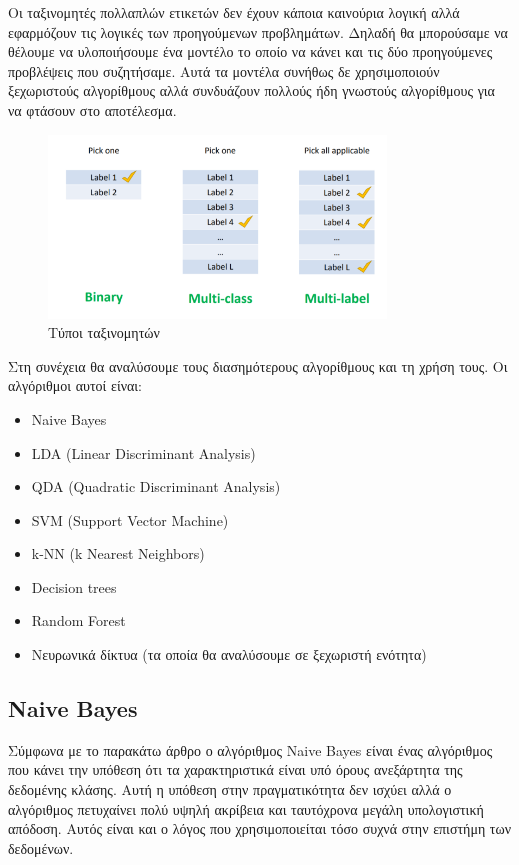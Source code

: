 Οι ταξινομητές πολλαπλών ετικετών δεν έχουν κάποια καινούρια
λογική αλλά εφαρμόζουν τις λογικές των προηγούμενων
προβλημάτων. Δηλαδή θα μπορούσαμε να θέλουμε να υλοποιήσουμε
ένα μοντέλο το οποίο να κάνει και τις δύο προηγούμενες
προβλέψεις που συζητήσαμε. Αυτά τα μοντέλα συνήθως δε
χρησιμοποιούν ξεχωριστούς αλγορίθμους αλλά συνδυάζουν
πολλούς ήδη γνωστούς αλγορίθμους για να φτάσουν στο
αποτέλεσμα.
\begin{figure}[H]
    \centering
    \includegraphics[width=0.8\textwidth]{images/typesOfClassifiers.png}
    \caption{Τύποι ταξινομητών}
\end{figure}

Στη συνέχεια θα αναλύσουμε τους διασημότερους αλγορίθμους
και τη χρήση τους. Οι αλγόριθμοι αυτοί είναι\cite{algo7, algo8, algo82}:
\begin{itemize}
    \item \textlatin{Naive Bayes}
    \item \textlatin{LDA (Linear Discriminant Analysis)}
    \item \textlatin{QDA (Quadratic Discriminant Analysis)}
    \item \textlatin{SVM (Support Vector Machine)}
    \item \textlatin{k-NN (k Nearest Neighbors)}
    \item \textlatin{Decision trees}
    \item \textlatin{Random Forest}
    \item Νευρωνικά δίκτυα (τα οποία θα αναλύσουμε σε ξεχωριστή ενότητα)
\end{itemize}

\subsection{\textlatin{Naive Bayes}}
Σύμφωνα με το παρακάτω άρθρο \cite{webb2010naive} ο αλγόριθμος \textlatin{Naive Bayes} είναι
ένας αλγόριθμος που κάνει την υπόθεση ότι τα χαρακτηριστικά είναι υπό όρους ανεξάρτητα της
δεδομένης κλάσης. Αυτή η υπόθεση στην πραγματικότητα δεν ισχύει αλλά ο αλγόριθμος πετυχαίνει
πολύ υψηλή ακρίβεια και ταυτόχρονα μεγάλη υπολογιστική απόδοση. Αυτός είναι και ο λόγος που
χρησιμοποιείται τόσο συχνά στην επιστήμη των δεδομένων.

